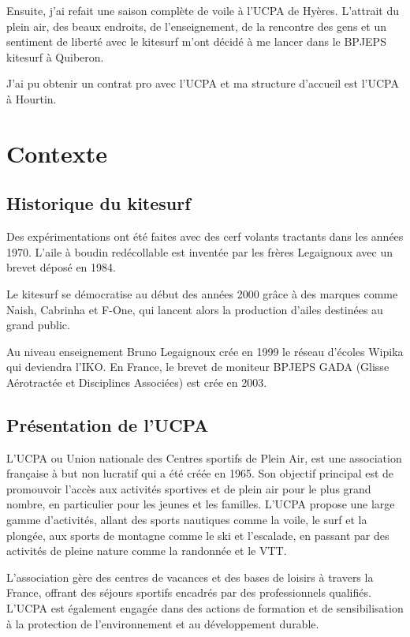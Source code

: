 \documentclass[11pt,a4paper]{report}
\begin{document}
Ensuite, j'ai refait une saison complète de voile à l'UCPA\cite{ucpa}
de Hyères. L'attrait du plein air, des beaux endroits, de l'enseignement,
de la rencontre des gens et un sentiment de liberté avec le kitesurf  
m'ont décidé à me lancer dans le BPJEPS kitesurf à Quiberon.

J'ai  pu obtenir un contrat pro avec l'UCPA et 
ma structure d'accueil est l'UCPA à Hourtin.

\section{Contexte}
\subsection{Historique du kitesurf}
Des expérimentations ont été faites avec des cerf volants tractants 
dans les années 1970. L'aile à boudin redécollable est inventée 
par les frères Legaignoux avec un brevet déposé en 1984\cite{brevet_kite}.

Le kitesurf se démocratise au début des années 2000 grâce à des
marques comme Naish, Cabrinha et F-One, qui lancent alors la 
production d’ailes destinées au grand public.

Au niveau enseignement Bruno Legaignoux crée en 1999 le
réseau d'écoles Wipika qui deviendra l'IKO\cite{iko}.
En France, le brevet de moniteur BPJEPS GADA (Glisse Aérotractée 
et Disciplines Associées) est crée en 2003.

\subsection{Présentation de l'UCPA}
L'UCPA ou Union nationale des Centres sportifs de Plein Air, est une association
française à but non lucratif qui a été créée en 1965. Son objectif principal est
de promouvoir l'accès aux activités sportives et de plein air pour le plus grand
nombre, en particulier pour les jeunes et les familles. L'UCPA propose une large
gamme d'activités, allant des sports nautiques comme la voile, le surf et la plongée,
aux sports de montagne comme le ski et l'escalade, en passant par des activités de
pleine nature comme la randonnée et le VTT.

L'association gère des centres de vacances et des bases de loisirs à travers la
France, offrant des séjours sportifs encadrés par des professionnels qualifiés.
L'UCPA est également engagée dans des actions de formation et de sensibilisation 
à la protection de l'environnement et au développement durable.
\end{document}
